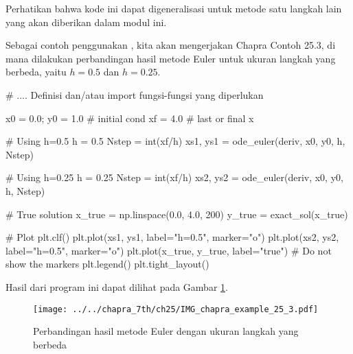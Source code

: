 Perhatikan bahwa kode ini dapat digeneralisasi untuk metode satu langkah lain yang akan
diberikan dalam modul ini.

Sebagai contoh penggunakan , kita akan mengerjakan Chapra Contoh 25.3,
di mana dilakukan perbandingan hasil metode Euler untuk ukuran langkah yang berbeda, yaitu
$h=0.5$ dan $h=0.25$.
\begin{pythoncode}
# .... Definisi dan/atau import fungsi-fungsi yang diperlukan

x0 = 0.0; y0 = 1.0 # initial cond
xf = 4.0 # last or final x

# Using h=0.5
h = 0.5
Nstep = int(xf/h)
xs1, ys1 = ode_euler(deriv, x0, y0, h, Nstep)

# Using h=0.25
h = 0.25
Nstep = int(xf/h)
xs2, ys2 = ode_euler(deriv, x0, y0, h, Nstep)

# True solution
x_true = np.linspace(0.0, 4.0, 200)
y_true = exact_sol(x_true)

# Plot
plt.clf()
plt.plot(xs1, ys1, label="h=0.5", marker="o")
plt.plot(xs2, ys2, label="h=0.5", marker="o")
plt.plot(x_true, y_true, label="true") # Do not show the markers
plt.legend()
plt.tight_layout()
\end{pythoncode}
Hasil dari program ini dapat dilihat pada Gambar \ref{fig:example_25_3}.


\begin{figure}[h]
{\centering
\texttt{[image: ../../chapra\_7th/ch25/IMG\_chapra\_example\_25\_3.pdf]}
\par}
\caption{Perbandingan hasil metode Euler dengan ukuran langkah yang berbeda}
\label{fig:example_25_3}
\end{figure}



